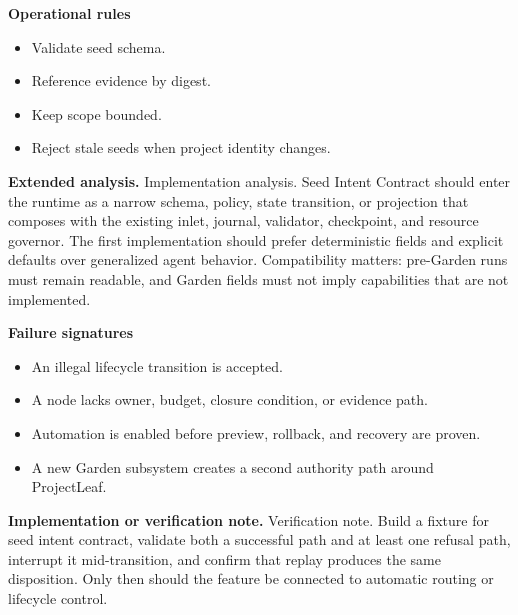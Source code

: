 \documentclass[10pt,letterpaper,oneside]{article}
\begin{document}
\textbf{Operational rules}
\begin{itemize}
\item Validate seed schema.
\item Reference evidence by digest.
\item Keep scope bounded.
\item Reject stale seeds when project identity changes.
\end{itemize}
\textbf{Extended analysis.} Implementation analysis. Seed Intent Contract should enter the runtime as a narrow schema, policy, state transition, or projection that composes with the existing inlet, journal, validator, checkpoint, and resource governor. The first implementation should prefer deterministic fields and explicit defaults over generalized agent behavior. Compatibility matters: pre-Garden runs must remain readable, and Garden fields must not imply capabilities that are not implemented.

\textbf{Failure signatures}
\begin{itemize}
\item An illegal lifecycle transition is accepted.
\item A node lacks owner, budget, closure condition, or evidence path.
\item Automation is enabled before preview, rollback, and recovery are proven.
\item A new Garden subsystem creates a second authority path around ProjectLeaf.
\end{itemize}
\textbf{Implementation or verification note.} Verification note. Build a fixture for seed intent contract, validate both a successful path and at least one refusal path, interrupt it mid-transition, and confirm that replay produces the same disposition. Only then should the feature be connected to automatic routing or lifecycle control.
\end{document}
